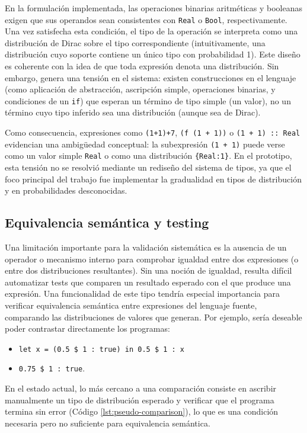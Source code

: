 En la formulación implementada, las operaciones binarias aritméticas y
booleanas exigen que sus operandos sean consistentes con
\lstinline|Real| o \lstinline|Bool|, respectivamente. Una vez
satisfecha esta condición, el tipo de la operación se interpreta como
una distribución de Dirac sobre el tipo correspondiente (intuitivamente,
una distribución cuyo soporte contiene un único tipo con probabilidad
1). Este diseño es coherente con la idea de que toda expresión denota
una distribución. Sin embargo, genera una tensión en el sistema:
existen construcciones en el lenguaje (como aplicación de abstracción,
ascripción simple, operaciones binarias, y condiciones de un
\lstinline|if|) que esperan un término de tipo simple (un valor), no
un término cuyo tipo inferido sea una distribución (aunque sea de Dirac).


Como consecuencia, expresiones como \lstinline|(1+1)+7|,
\lstinline|(f (1 + 1))| o \lstinline|(1 + 1) :: Real| evidencian una
ambigüedad conceptual: la subexpresión \lstinline|(1 + 1)| puede verse
como un valor simple \lstinline|Real| o como una distribución
\lstinline|{Real:1}|. En el prototipo, esta tensión no se resolvió
mediante un rediseño del sistema de tipos, ya que el foco principal
del trabajo fue implementar la gradualidad en tipos de distribución y
en probabilidades desconocidas.


\subsection{Equivalencia semántica y testing}\label{subsec:lim-igualdad}

Una limitación importante para la validación sistemática es la
ausencia de un operador o mecanismo interno para comprobar igualdad
entre dos expresiones (o entre dos distribuciones resultantes). Sin
una noción de igualdad, resulta difícil automatizar tests que comparen
un resultado esperado con el que produce una expresión. Una
funcionalidad de este tipo tendría especial importancia para verificar
equivalencia semántica entre expresiones del lenguaje fuente,
comparando las distribuciones de valores que generan. Por ejemplo,
sería deseable poder contrastar directamente los programas:
\begin{itemize}
\item \lstinline|let x = (0.5 $ 1 : true) in 0.5 $ 1 : x| 
\item \lstinline|0.75 $ 1 : true|.
\end{itemize}


En el estado actual, lo más cercano a una comparación consiste en
ascribir manualmente un tipo de distribución esperado y verificar que
el programa termina sin error (Código \ref{lst:pseudo-comparison}), lo
que es una condición necesaria pero no suficiente para equivalencia
semántica.

